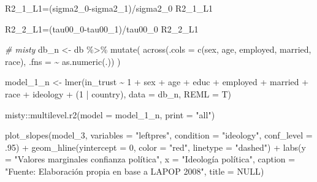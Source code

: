 \documentclass[
  12pt,
  a4paper,
]{article}
\newenvironment{Shaded}{\begin{snugshade}}{\end{snugshade}}
\newcommand{\AttributeTok}[1]{\textcolor[rgb]{0.77,0.63,0.00}{#1}}
\newcommand{\CommentTok}[1]{\textcolor[rgb]{0.56,0.35,0.01}{\textit{#1}}}
\newcommand{\ConstantTok}[1]{\textcolor[rgb]{0.00,0.00,0.00}{#1}}
\newcommand{\DecValTok}[1]{\textcolor[rgb]{0.00,0.00,0.81}{#1}}
\newcommand{\FunctionTok}[1]{\textcolor[rgb]{0.00,0.00,0.00}{#1}}
\newcommand{\NormalTok}[1]{#1}
\newcommand{\OtherTok}[1]{\textcolor[rgb]{0.56,0.35,0.01}{#1}}
\newcommand{\SpecialCharTok}[1]{\textcolor[rgb]{0.00,0.00,0.00}{#1}}
\newcommand{\StringTok}[1]{\textcolor[rgb]{0.31,0.60,0.02}{#1}}
\begin{document}
\begin{Shaded}
\begin{Highlighting}[]
\NormalTok{R2\_1\_L1}\OtherTok{=}\NormalTok{(sigma2\_0}\SpecialCharTok{{-}}\NormalTok{sigma2\_1)}\SpecialCharTok{/}\NormalTok{sigma2\_0}
\NormalTok{R2\_1\_L1}

\NormalTok{R2\_2\_L1}\OtherTok{=}\NormalTok{(tau00\_0}\SpecialCharTok{{-}}\NormalTok{tau00\_1)}\SpecialCharTok{/}\NormalTok{tau00\_0}
\NormalTok{R2\_2\_L1}

\CommentTok{\# misty}
\NormalTok{db\_n }\OtherTok{\textless{}{-}}\NormalTok{ db }\SpecialCharTok{\%\textgreater{}\%} 
  \FunctionTok{mutate}\NormalTok{(}
    \FunctionTok{across}\NormalTok{(}\AttributeTok{.cols =} \FunctionTok{c}\NormalTok{(sex, age, employed, married, race),}
           \AttributeTok{.fns =} \SpecialCharTok{\textasciitilde{}} \FunctionTok{as.numeric}\NormalTok{(.))}
\NormalTok{  )}
 

\NormalTok{model\_1\_n }\OtherTok{\textless{}{-}} \FunctionTok{lmer}\NormalTok{(in\_trust }\SpecialCharTok{\textasciitilde{}} \DecValTok{1} \SpecialCharTok{+}\NormalTok{ sex }\SpecialCharTok{+}\NormalTok{ age }\SpecialCharTok{+}\NormalTok{ educ }\SpecialCharTok{+}\NormalTok{ employed }\SpecialCharTok{+}\NormalTok{ married }\SpecialCharTok{+}
\NormalTok{                race }\SpecialCharTok{+}\NormalTok{ ideology }\SpecialCharTok{+}\NormalTok{ (}\DecValTok{1} \SpecialCharTok{|}\NormalTok{ country),}
                \AttributeTok{data =}\NormalTok{ db\_n, }
                \AttributeTok{REML =}\NormalTok{ T)}

\NormalTok{misty}\SpecialCharTok{::}\FunctionTok{multilevel.r2}\NormalTok{(}\AttributeTok{model =}\NormalTok{ model\_1\_n, }\AttributeTok{print =} \StringTok{"all"}\NormalTok{)}


\FunctionTok{plot\_slopes}\NormalTok{(model\_3, }
            \AttributeTok{variables =} \StringTok{"leftpres"}\NormalTok{, }
            \AttributeTok{condition =} \StringTok{"ideology"}\NormalTok{,}
            \AttributeTok{conf\_level =}\NormalTok{ .}\DecValTok{95}\NormalTok{) }\SpecialCharTok{+}
  \FunctionTok{geom\_hline}\NormalTok{(}\AttributeTok{yintercept =} \DecValTok{0}\NormalTok{, }
             \AttributeTok{color =} \StringTok{"red"}\NormalTok{, }
             \AttributeTok{linetype =} \StringTok{"dashed"}\NormalTok{) }\SpecialCharTok{+}
  \FunctionTok{labs}\NormalTok{(}\AttributeTok{y =} \StringTok{"Valores marginales confianza política"}\NormalTok{,}
       \AttributeTok{x =} \StringTok{"Ideología política"}\NormalTok{,}
       \AttributeTok{caption =} \StringTok{"Fuente: Elaboración propia en base a LAPOP 2008"}\NormalTok{,}
       \AttributeTok{title =} \ConstantTok{NULL}\NormalTok{)}



\end{Highlighting}
\end{Shaded}
\end{document}
